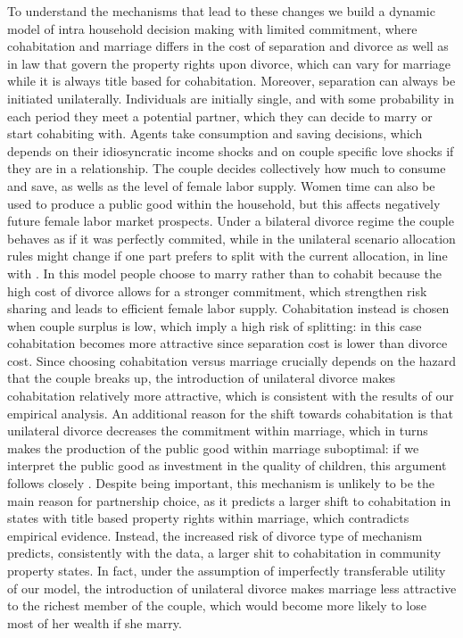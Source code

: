 \documentclass[12pt]{article}
\numberwithin{table}{section}
\begin{document}
To understand the mechanisms that lead to these changes we build a dynamic model of intra household decision making with limited commitment, where cohabitation and marriage differs in the cost of separation and divorce as well as in law that govern the property rights upon divorce, which can vary for marriage while it is always title based for cohabitation. Moreover, separation can always be initiated unilaterally. Individuals are initially single, and with some probability in each period they meet a potential partner, which they can decide to marry or start cohabiting with. Agents take consumption and saving decisions, which depends on their idiosyncratic income shocks and on couple specific love shocks if they are in a relationship. The couple decides collectively how much to consume and save, as wells as the level of female labor supply. Women time can also be used to produce a public good within the household, but this affects negatively future female labor market prospects. Under a bilateral divorce regime the couple behaves as if it was perfectly commited, while in the unilateral scenario allocation rules might change if one part prefers to split with the current allocation, in line with \citet{voena2015}. In this model people choose to marry rather than to cohabit because the high cost of divorce allows for a stronger commitment, which strengthen risk sharing and leads to efficient female labor supply. Cohabitation instead is chosen when couple surplus is low, which imply a high risk of splitting: in this case cohabitation becomes more attractive since separation cost is lower than divorce cost. Since choosing cohabitation versus marriage crucially depends on the hazard that the couple breaks up, the introduction of unilateral divorce makes cohabitation relatively more attractive, which is consistent with the results of our empirical analysis. An additional reason for the shift towards cohabitation is that unilateral divorce decreases the commitment within marriage, which in turns makes the production of the public good within marriage suboptimal: if we interpret the public good as investment in the quality of children, this argument follows closely \citet{lafortune2019}. Despite being important, this mechanism is unlikely to be the main reason for partnership choice, as it predicts a larger shift to cohabitation in states with title based property rights within marriage, which contradicts empirical evidence. Instead, the increased risk of divorce type of mechanism predicts, consistently with the data, a larger shit to cohabitation in community property states. In fact, under the assumption of imperfectly transferable utility of our model, the introduction of unilateral divorce makes marriage less attractive to the richest member of the couple, which would become more likely to lose most of her wealth if she marry.\\
\end{document}
